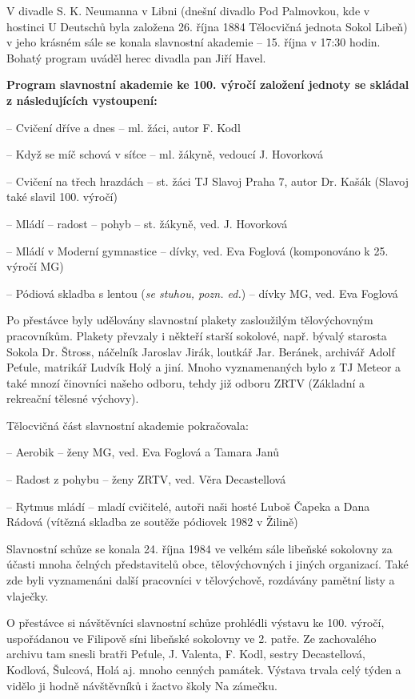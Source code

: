 V divadle S. K. Neumanna v Libni (dnešní divadlo Pod Palmovkou, kde v
hostinci U Deutschů byla založena 26. října 1884 Tělocvičná jednota
Sokol Libeň) v jeho krásném sále se konala slavnostní akademie -- 15.
října v 17:30 hodin. Bohatý program uváděl herec divadla pan Jiří Havel.

\textbf{Program slavnostní akademie ke 100. výročí založení jednoty se
skládal z následujících vystoupení:}

-- Cvičení dříve a dnes -- ml. žáci, autor F. Kodl

-- Když se míč schová v síťce -- ml. žákyně, vedoucí J. Hovorková

-- Cvičení na třech hrazdách -- st. žáci TJ Slavoj Praha 7, autor Dr.
Kašák (Slavoj také slavil 100. výročí)

-- Mládí -- radost -- pohyb -- st. žákyně, ved. J. Hovorková

-- Mládí v Moderní gymnastice -- dívky, ved. Eva Foglová (komponováno k
25. výročí MG)

-- Pódiová skladba s lentou (\emph{se stuhou, pozn. ed.}) -- dívky MG,
ved. Eva Foglová

Po přestávce byly udělovány slavnostní plakety zasloužilým tělovýchovným
pracovníkům. Plakety převzaly i někteří starší sokolové, např. bývalý
starosta Sokola Dr. Štross, náčelník Jaroslav Jirák, loutkář Jar.
Beránek, archivář Adolf Peťule, matrikář Ludvík Holý a jiní. Mnoho
vyznamenaných bylo z TJ Meteor a také mnozí činovníci našeho odboru,
tehdy již odboru ZRTV (Základní a rekreační tělesné výchovy).

Tělocvičná část slavnostní akademie pokračovala:

-- Aerobik -- ženy MG, ved. Eva Foglová a Tamara Janů

-- Radost z pohybu -- ženy ZRTV, ved. Věra Decastellová

-- Rytmus mládí -- mladí cvičitelé, autoři naši hosté Luboš Čapeka a
Dana Rádová (vítězná skladba ze soutěže pódiovek 1982 v Žilině)

Slavnostní schůze se konala 24. října 1984 ve velkém sále libeňské
sokolovny za účasti mnoha čelných představitelů obce, tělovýchovných i
jiných organizací. Také zde byli vyznamenáni další pracovníci v
tělovýchově, rozdávány pamětní listy a vlaječky.

O přestávce si návštěvníci slavnostní schůze prohlédli výstavu ke 100.
výročí, uspořádanou ve Filipově síni libeňské sokolovny ve 2. patře. Ze
zachovalého archivu tam snesli bratři Peťule, J. Valenta, F. Kodl,
sestry Decastellová, Kodlová, Šulcová, Holá aj. mnoho cenných památek.
Výstava trvala celý týden a vidělo ji hodně návštěvníků i žactvo školy
Na zámečku.

